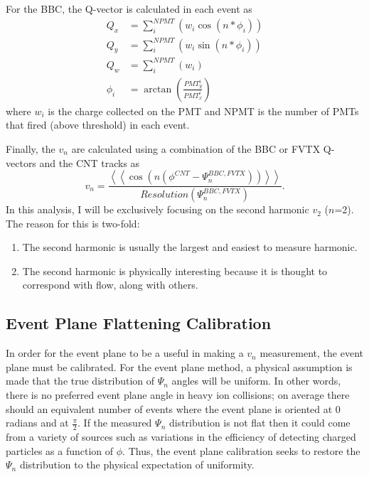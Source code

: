 For the BBC, the Q-vector is calculated in each event as
\begin{align}
Q_x &= \sum^{NPMT}_i( w_i \cos(n * \phi_i)) \\
Q_y &= \sum^{NPMT}_i( w_i \sin(n * \phi_i)) \\
Q_w &= \sum^{NPMT}_i( w_i ) \\
\phi_i &= \arctan(\frac{PMT_{y}^i}{PMT_{x}^i}) 
\label{eqn:bbc_ep_eqns}
\end{align}
where $w_i$ is the charge collected on the PMT and NPMT is the number of PMTs that fired (above threshold) in each event.

Finally, the $v_n$ are calculated using a combination of the BBC or FVTX Q-vectors and the CNT tracks as
\begin{equation}
v_n = \frac{\left<\left<\cos(n(\phi^{CNT} - \Psi^{BBC,FVTX}_n))\right>\right>}{Resolution(\Psi^{BBC,FVTX}_n)}.
\end{equation}
In this analysis, I will be exclusively focusing on the second harmonic $v_2$ ($n$=2). The reason for this is two-fold:
\begin{enumerate}
	\item{The second harmonic is usually the largest and easiest to measure harmonic.}
	\item{The second harmonic is physically interesting because it is thought to correspond with flow, along with others.}
\end{enumerate}
\subsection{Event Plane Flattening Calibration}
In order for the event plane to be a useful in making a $v_n$ measurement, the event plane must be calibrated. For the event plane method, a physical assumption is made that the true
distribution of $\Psi_n$ angles will be uniform. In other words, there is no preferred event plane angle in heavy ion collisions; on average there should an equivalent number of events where the
event plane is oriented at 0 radians and at $\frac{\pi}{2}$. If the measured $\Psi_n$ distribution is not flat then it could come from a variety of sources such as variations in the efficiency of detecting charged particles as a function of $\phi$. Thus, the event plane calibration seeks to restore the $\Psi_n$ distribution to the physical expectation of uniformity.

